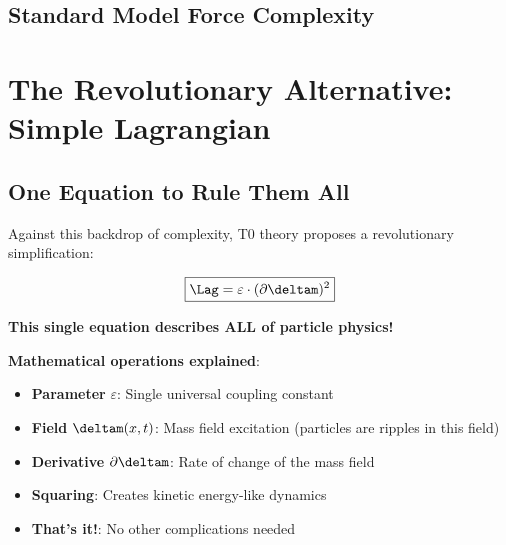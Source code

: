 	\subsection{Standard Model Force Complexity}
	
	\begin{table}[htbp]
		\centering
		\caption{Standard Model force complexity}
		\label{tab:sm_force_complexity}
	\end{table}
	
	\section{The Revolutionary Alternative: Simple Lagrangian}
	
	\subsection{One Equation to Rule Them All}
	
	Against this backdrop of complexity, T0 theory proposes a revolutionary simplification:
	
	\begin{equation}
		\boxed{\Lag = \varepsilon \cdot (\partial \deltam)^2}
		\label{eq:revolutionary_lagrangian}
	\end{equation}
	
	\textbf{This single equation describes ALL of particle physics!}
	
	\textbf{Mathematical operations explained}:
	\begin{itemize}
		\item \textbf{Parameter} $\varepsilon$: Single universal coupling constant
		\item \textbf{Field} $\deltam(x,t)$: Mass field excitation (particles are ripples in this field)
		\item \textbf{Derivative} $\partial \deltam$: Rate of change of the mass field
		\item \textbf{Squaring}: Creates kinetic energy-like dynamics
		\item \textbf{That's it!}: No other complications needed
	\end{itemize}
	
